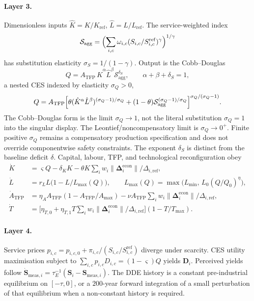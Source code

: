 \documentclass[11pt]{article}
\theoremstyle{definition}
\begin{document}
\paragraph{Layer 3.} Dimensionless inputs $\hat K=K/K_{\mathrm{ref}}$, $\hat L=L/L_{\mathrm{ref}}$. The service-weighted index
\[
\mathcal S_{\mathrm{agg}}=\Bigl(\sum_{i,c}\omega_{i,c}(S_{i,c}/S_{i,c}^{\mathrm{ref}})^\gamma\Bigr)^{1/\gamma}
\]
has substitution elasticity $\sigma_S=1/(1-\gamma)$. Output is the Cobb--Douglas
\[
Q=A_{\mathrm{TFP}}\,\hat K^\alpha\hat L^\beta\mathcal S_{\mathrm{agg}}^{\delta_S},\qquad\alpha+\beta+\delta_S=1,
\]
a nested CES indexed by elasticity $\sigma_Q>0$,
\[
Q=A_{\mathrm{TFP}}\Bigl[\theta(\hat K^\alpha\hat L^\beta)^{(\sigma_Q-1)/\sigma_Q}+(1-\theta)\mathcal S_{\mathrm{agg}}^{(\sigma_Q-1)/\sigma_Q}\Bigr]^{\sigma_Q/(\sigma_Q-1)}.
\]
The Cobb--Douglas form is the limit $\sigma_Q\to1$, not the literal substitution $\sigma_Q=1$ into the singular display. The Leontief/noncompensatory limit is $\sigma_Q\to0^+$. Finite positive $\sigma_Q$ remains a compensatory production specification and does not override componentwise safety constraints. The exponent $\delta_S$ is distinct from the baseline deficit $\delta$. Capital, labour, TFP, and technological reconfiguration obey
\begin{align}
\dot K &= \varsigma Q-\delta_K K-\theta K\sum_i w_i\|\boldsymbol\Delta_i^{\mathrm{econ}}\|/\Delta_{i,\mathrm{ref}},
\label{eq:k-corrected}\\
\dot L &= r_L L\bigl(1-L/L_{\max}(Q)\bigr),\qquad L_{\max}(Q)=\max\bigl(L_{\min},\,L_0(Q/Q_0)^\eta\bigr),
\label{eq:l}\\
\dot A_{\mathrm{TFP}} &= \eta_A A_{\mathrm{TFP}}(1-A_{\mathrm{TFP}}/A_{\max})-\nu A_{\mathrm{TFP}}\sum_i w_i\|\boldsymbol\Delta_i^{\mathrm{econ}}\|/\Delta_{i,\mathrm{ref}},
\label{eq:a-corrected}\\
\dot T &= \bigl[\eta_{T,0}+\eta_{T,1}T\sum_i w_i\|\boldsymbol\Delta_i^{\mathrm{econ}}\|/\Delta_{i,\mathrm{ref}}\bigr](1-T/T_{\max}).
\label{eq:t-corrected}
\end{align}

\paragraph{Layer 4.} Service prices $p_{i,c}=p_{i,c,0}+\pi_{i,c}/(S_{i,c}/S_{i,c}^{\mathrm{ref}})$ diverge under scarcity. CES utility maximisation \cite{arrow1961} subject to $\sum_{i,c}p_{i,c}D_{i,c}=(1-\varsigma)Q$ yields $\mathbf D_i$. Perceived yields follow $\dot{\mathbf S}_{\mathrm{meas},i}=\tau_E^{-1}(\mathbf S_i-\mathbf S_{\mathrm{meas},i})$. The DDE history is a constant pre-industrial equilibrium on $[-\tau,0]$, or a $200$-year forward integration of a small perturbation of that equilibrium when a non-constant history is required.
\end{document}

